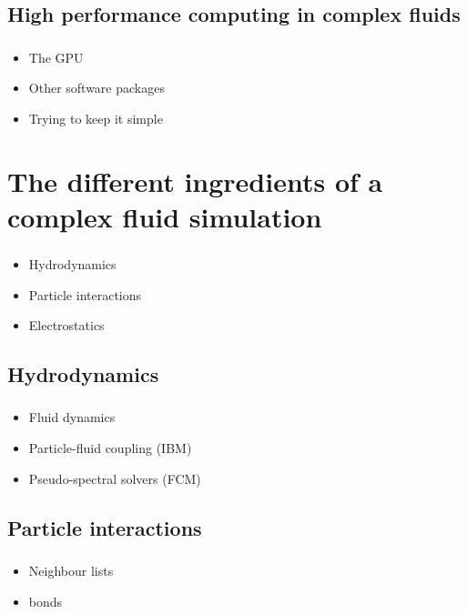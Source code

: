 \documentclass{beamer}
\begin{document}
\subsection{High performance computing in complex fluids}
\begin{frame}
  \frametitle{\insertsubsectionnavigation{\linewidth}} 
  \begin{itemize}
  \item The GPU
  \item Other software packages
  \item Trying to keep it simple
  \end{itemize}
\end{frame}


\section{The different ingredients of a complex fluid simulation}

\begin{frame}
  \frametitle{\insertsectionnavigation{\linewidth}} 
  \begin{itemize}
  \item Hydrodynamics
  \item Particle interactions
  \item Electrostatics
  \end{itemize}
\end{frame}

\subsection{Hydrodynamics}
\begin{frame}
  \frametitle{\insertsubsectionnavigation{\linewidth}}
  \begin{itemize}
  \item Fluid dynamics
  \item Particle-fluid coupling (IBM)
  \item Pseudo-spectral solvers (FCM)
  \end{itemize}
\end{frame}

\subsection{Particle interactions}
\begin{frame}
  \frametitle{\insertsubsectionnavigation{\linewidth}}
  \begin{itemize}
  \item Neighbour lists
  \item bonds
  \end{itemize}
\end{frame}
\end{document}
